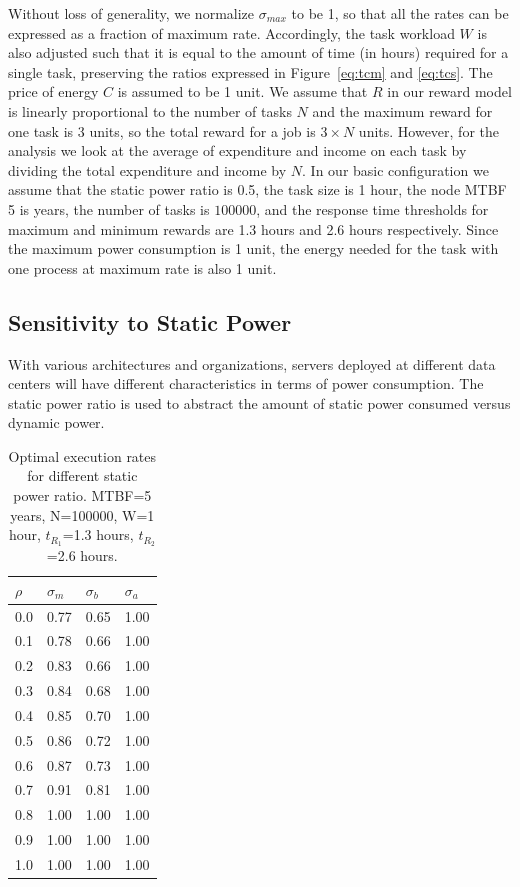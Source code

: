 Without loss of generality, we normalize $\sigma_{max}$ to be 1, so
that all the rates can be expressed as a fraction of maximum
rate. Accordingly, the task workload $W$ is also adjusted such that
it is equal to the amount of time (in hours) required for a single
task, preserving the ratios expressed in
Figure~\ref{eq:tcm} and \ref{eq:tcs}. The price of
energy $C$ is assumed to be 1 unit. We assume that $R$ in our reward model
is linearly proportional to the number of tasks $N$ and the maximum
reward for one task is 3 units, so the total reward for a job is $3
\times N$ units.  However, for the analysis we look
at the average of expenditure and income on each task by dividing the
total expenditure and income by $N$. In our basic configuration we
assume that the static power ratio is 0.5, the task size is 1 hour, the node MTBF 5 is
years, the number of tasks is $100000$, and the response time thresholds for
maximum and minimum rewards are 1.3 hours and 2.6 hours
respectively. Since the maximum power consumption is 1 unit, the
energy needed for the task with one process at maximum rate is also 1
unit. 

\subsection{Sensitivity to Static Power}

With various architectures and organizations, servers deployed at
different data centers will have different characteristics in terms of
power consumption. The static power ratio is used to abstract the
amount of static power consumed versus dynamic power.  

\begin{table}[!h]\small
	\caption{Optimal execution rates for different static power ratio. MTBF=5 years, N=100000, W=1 hour, $t_{R_1}$=1.3 hours, $t_{R_2}$=2.6 hours.}
	\centering
		\begin{tabular}{|p{1cm}|p{1cm}|p{1cm}|p{1cm}|}
		\hline
		$\rho$ & $\sigma_m$ & $\sigma_b$ & $\sigma_a$ \\
		\hline
		0.0 &	0.77 & 	0.65 & 	1.00 \\
		\hline 
		0.1 &	0.78 &	0.66 &	1.00 \\
		\hline
		0.2 &	0.83 &	0.66 &	1.00 \\
		\hline
		0.3	&   0.84 &	0.68 &	1.00 \\
		\hline
		0.4	&   0.85 &	0.70 &	1.00 \\
		\hline
		0.5	&   0.86 &	0.72 &	1.00 \\
		\hline
		0.6	&   0.87 &	0.73 &	1.00 \\
		\hline
		0.7	&	0.91 &	0.81 &	1.00 \\
		\hline
		0.8	& 	1.00 &	1.00 &	1.00 \\
		\hline
		0.9	&	1.00 &	1.00 &	1.00 \\
		\hline
		1.0	&	1.00 &	1.00 &	1.00 \\
		\hline
		\end{tabular}
	\label{tbl:rho}
\end{table}

